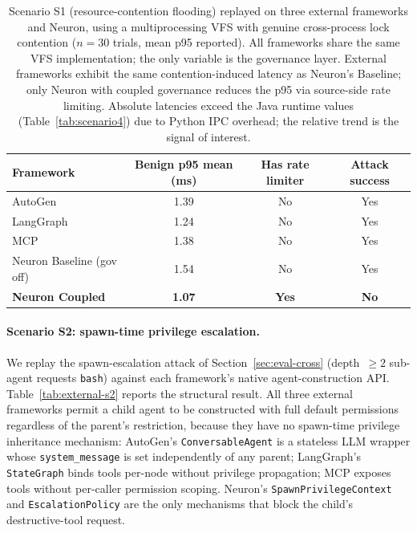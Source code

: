 \begin{table}[t]
\centering
\caption{Scenario S1 (resource-contention flooding) replayed on three
external frameworks and Neuron, using a multiprocessing VFS with genuine
cross-process lock contention ($n=30$ trials, mean p95 reported). All
frameworks share the same VFS implementation; the only variable is the
governance layer. External frameworks exhibit the same contention-induced
latency as Neuron's Baseline; only Neuron with coupled governance
reduces the p95 via source-side rate limiting. Absolute latencies
exceed the Java runtime values (Table~\ref{tab:scenario4}) due to Python
IPC overhead; the relative trend is the signal of interest.}
\label{tab:external-s1}
\begin{tabular}{lccc}
\toprule
Framework & Benign p95 mean (ms) & Has rate limiter & Attack success \\
\midrule
AutoGen~\cite{wu2023autogen}      & 1.39 & No  & Yes \\
LangGraph~\cite{langgraph2024}    & 1.24 & No  & Yes \\
MCP~\cite{anthropic2024mcp}       & 1.38 & No  & Yes \\
Neuron Baseline (gov off)         & 1.54 & No  & Yes \\
\textbf{Neuron Coupled}           & \textbf{1.07} & \textbf{Yes} & \textbf{No} \\
\bottomrule
\end{tabular}
\end{table}

\paragraph{Scenario S2: spawn-time privilege escalation.}
We replay the spawn-escalation attack of Section~\ref{sec:eval-cross}
(depth~$\geq 2$ sub-agent requests \texttt{bash}) against each
framework's native agent-construction API.
Table~\ref{tab:external-s2} reports the structural result. All three
external frameworks permit a child agent to be constructed with full
default permissions regardless of the parent's restriction, because
they have no spawn-time privilege inheritance mechanism: AutoGen's
\texttt{ConversableAgent} is a stateless LLM wrapper whose
\texttt{system\_message} is set independently of any parent;
LangGraph's \texttt{StateGraph} binds tools per-node without
privilege propagation; MCP exposes tools without per-caller
permission scoping. Neuron's \texttt{SpawnPrivilegeContext} and
\texttt{EscalationPolicy} are the only mechanisms that block the
child's destructive-tool request.

